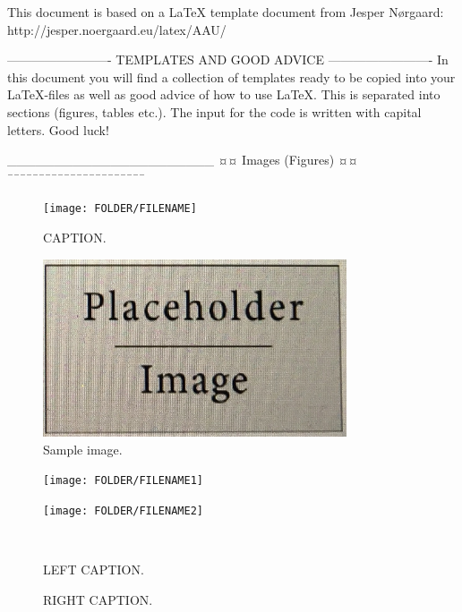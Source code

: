 This document is based on a LaTeX template document from Jesper Nørgaard: http://jesper.noergaard.eu/latex/AAU/

-------------------------
TEMPLATES AND GOOD ADVICE
-------------------------
In this document you will find a collection of templates ready to be copied into your LaTeX-files as well as good advice of how to use LaTeX. This is separated into sections (figures, tables etc.). The input for the code is written with capital letters.
Good luck!

______________________
¤¤ Images (Figures) ¤¤
¯¯¯¯¯¯¯¯¯¯¯¯¯¯¯¯¯¯¯¯¯¯

\begin{figure}[H] %
	\centering
	\texttt{[image: FOLDER/FILENAME]}
	\caption{CAPTION.}
	\label{figur:LABEL}
\end{figure}

\begin{figure}[H] %
	\centering
	\includegraphics[width=0.80\textwidth]{figures/example.jpg}
	\caption{Sample image.}
	\label{fig:example}
\end{figure}

\begin{figure}[H] %
	\centering
	\begin{minipage}[b]{0.48\textwidth}
	\centering
	\texttt{[image: FOLDER/FILENAME1]} %
	\end{minipage}
	\hfill
	\begin{minipage}[b]{0.48\textwidth}
	\centering
	\texttt{[image: FOLDER/FILENAME2]} %
	\end{minipage}
	\\ %
	\begin{minipage}[t]{0.48\textwidth}
	\caption{LEFT CAPTION.} %
	\label{fig:LABEL1}
	\end{minipage}
	\hfill
	\begin{minipage}[t]{0.48\textwidth}
	\caption{RIGHT CAPTION.} %
	\label{fig:LABEL2}
	\end{minipage}
\end{figure}

